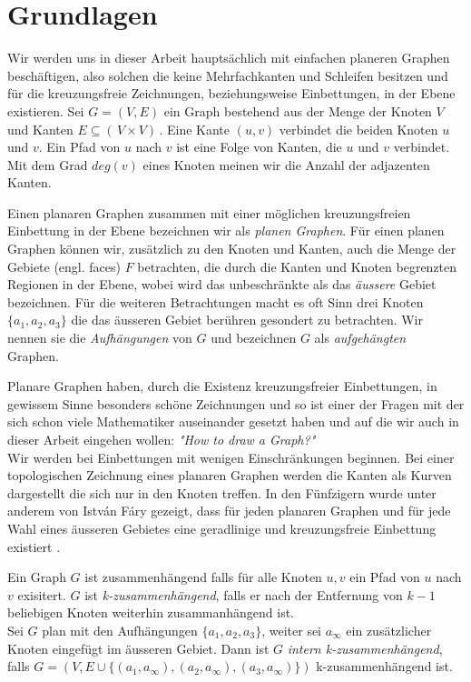 \chapter{Grundlagen}\label{pre}

Wir werden uns in dieser Arbeit hauptsächlich mit einfachen planeren Graphen beschäftigen, also solchen die keine Mehrfachkanten und Schleifen besitzen und für die kreuzungsfreie Zeichnungen, beziehungsweise Einbettungen, in der Ebene existieren. Sei $G = (V,E)$ ein Graph bestehend aus der Menge der Knoten $V$ und Kanten $E \subseteq ( \,V \times V ) \,$. Eine Kante $(u,v)$ verbindet die beiden Knoten $u$ und $v$. Ein Pfad von $u$ nach $v$ ist eine Folge von Kanten, die $u$ und $v$ verbindet. Mit dem Grad $deg(v)$ eines Knoten meinen wir die Anzahl der adjazenten Kanten.\ 

Einen planaren Graphen zusammen mit einer möglichen kreuzungsfreien Einbettung in der Ebene bezeichnen wir als \textit{planen Graphen}. Für einen planen Graphen können wir, zusätzlich zu den Knoten und Kanten, auch die Menge der Gebiete (engl. faces) $F$ betrachten, die durch die Kanten und Knoten begrenzten Regionen in der Ebene, wobei wird das unbeschränkte als das \textit{äussere} Gebiet bezeichnen. Für die weiteren Betrachtungen macht es oft Sinn drei Knoten $\{a_1,a_2,a_3\}$ die das äusseren Gebiet berühren gesondert zu betrachten. Wir nennen sie die \textit{Aufhängungen} von $G$ und bezeichnen $G$ als \textit{aufgehängten} Graphen.\

Planare Graphen haben, durch die Existenz kreuzungsfreier Einbettungen, in gewissem Sinne besonders schöne Zeichnungen und so ist einer der Fragen mit der sich schon viele Mathematiker auseinander gesetzt haben und auf die wir auch in dieser Arbeit eingehen wollen: \textit{"How to draw a Graph?"}\cite{tutte63}\\

Wir werden bei Einbettungen mit wenigen Einschränkungen beginnen. Bei einer topologischen Zeichnung eines planaren Graphen werden die Kanten als Kurven dargestellt die sich nur in den Knoten treffen. In den Fünfzigern wurde unter anderem von István Fáry gezeigt, dass für jeden planaren Graphen und für jede Wahl eines äusseren Gebietes eine geradlinige und kreuzungsfreie Einbettung existiert \cite{fary48}.

\begin{definition}\label{int_3_con}
Ein Graph $G$ ist zusammenhängend falls für alle Knoten $u,v$ ein Pfad von $u$ nach $v$ exisitert. $G$ ist \textit{k-zusammenhängend}, falls er nach der Entfernung von $k-1$ beliebigen Knoten weiterhin zusammanhängend ist.\\
Sei $G$ plan mit den Aufhängungen $\{a_1,a_2,a_3\}$, weiter sei $a_\infty$ ein zusätzlicher Knoten eingefügt im äusseren Gebiet. Dann ist $G$ \textit{intern k-zusammenhängend}, falls $G=(V,E\cup \{(a_1,a_\infty),(a_2,a_\infty),(a_3,a_\infty)\})$ k-zusammenhängend ist. 
\end{definition}

